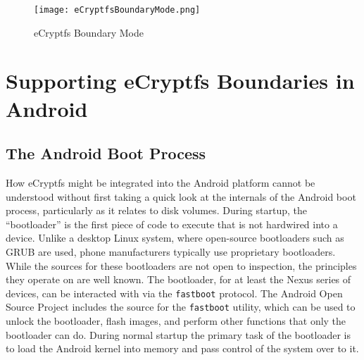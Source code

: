 \begin{figure}[htpb] 
\begin{center}
\texttt{[image: eCryptfsBoundaryMode.png]}\end{center}
\caption{eCryptfs Boundary Mode} \label{fig:ecryptfsboundary} \end{figure}

\section{Supporting eCryptfs Boundaries in Android}

\subsection{The Android Boot Process}
How eCryptfs might be integrated into the Android platform cannot be understood without first taking a quick look at the internals
of the Android boot process, particularly as it relates to disk volumes. During startup, the ``bootloader'' is the first piece of
code to execute that is not hardwired into a device. Unlike a desktop Linux system, where open-source bootloaders such as GRUB are
used, phone manufacturers typically use proprietary bootloaders. While the sources for these bootloaders are not open to inspection,
the principles they operate on are well known. The bootloader, for at least the Nexus series of devices, can be interacted with via
the \texttt{fastboot} protocol. The Android Open Source Project includes the source for the \texttt{fastboot} utility, which can be
used to unlock the bootloader, flash images, and perform other functions that only the bootloader can do.  During normal startup the
primary task of the bootloader is to load the Android kernel into memory and pass control of the system over to it. 

